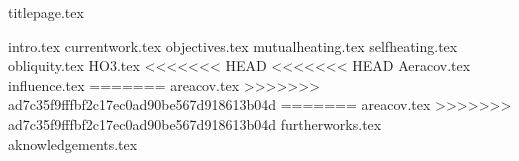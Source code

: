 \documentclass[twoside, twocolumn]{article}
\begin{document}
{titlepage.tex}

{intro.tex}
{currentwork.tex}
{objectives.tex}
{mutualheating.tex}
{selfheating.tex}
{obliquity.tex}
{HO3.tex}
<<<<<<< HEAD
<<<<<<< HEAD
{Aeracov.tex}
{influence.tex}
=======
{areacov.tex}
>>>>>>> ad7c35f9fffbf2c17ec0ad90be567d918613b04d
=======
{areacov.tex}
>>>>>>> ad7c35f9fffbf2c17ec0ad90be567d918613b04d
{furtherworks.tex}
{aknowledgements.tex}

\nocite{*}
\end{document}
